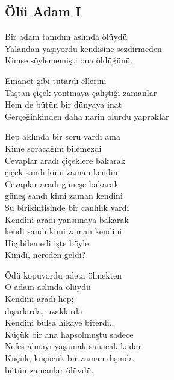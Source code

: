 \subsection{Ölü Adam I}

Bir adam tanıdım aslında ölüydü \\
Yalandan yaşıyordu kendisine sezdirmeden \\
Kimse söylememişti ona öldüğünü.

\noindent\newline
Emanet gibi tutardı ellerini \\
Taştan çiçek yontmaya çalıştığı zamanlar \\
Hem de bütün bir dünyaya inat \\
Gerçeğinkinden daha narin olurdu yapraklar

\noindent\newline
Hep aklında bir soru vardı ama \\
Kime soracağını bilemezdi \\
Cevaplar aradı çiçeklere bakarak \\
çiçek sandı kimi zaman kendini \\
Cevaplar aradı güneşe bakarak \\
güneş sandı kimi zaman kendini \\
Su birikintisinde bir canlılık vardı \\
Kendini aradı yansımaya bakarak \\
kendi sandı kimi zaman kendini \\
Hiç bilemedi işte böyle; \\
Kimdi, nereden geldi?

\noindent\newline
Ödü kopuyordu adeta ölmekten \\
O adam aslında ölüydü \\
Kendini aradı hep; \\
dışarlarda, uzaklarda \\
Kendini bulsa hikaye biterdi.. \\
Küçük bir ana hapsolmuştu sadece \\
Nefes almayı yaşamak sanacak kadar \\
Küçük, küçücük bir zaman dışında \\
bütün zamanlar ölüydü.